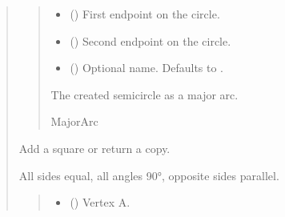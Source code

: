 \documentclass[letterpaper,10pt,english]{sphinxmanual}
\begin{document}
\begin{quote}
\begin{fulllineitems}
\begin{fulllineitems}
\begin{quote}
\begin{description}
\begin{itemize}
\item {} 
\sphinxAtStartPar
{} () \textendash{} First endpoint on the circle.

\item {} 
\sphinxAtStartPar
{} () \textendash{} Second endpoint on the circle.

\item {} 
\sphinxAtStartPar
{} (\sphinxstyleliteralemphasis{\sphinxupquote{ | }}) \textendash{} Optional name. Defaults to .

\end{itemize}

\sphinxAtStartPar
The created semicircle as a major arc.

\sphinxAtStartPar
MajorArc

\end{description}\end{quote}

\end{fulllineitems}


\begin{fulllineitems}
\label{\detokenize{pygeox:pygeox.add_objects.AddNamespace.square}}
\pysigstartsignatures
\pysiglinewithargsret
{}
{\sphinxparamcomma {}\sphinxparamcomma {}\sphinxparamcomma {}\sphinxparamcomma {}\sphinxparamcomma {}}
{}
\pysigstopsignatures
\sphinxAtStartPar
Add a square or return a copy.

\sphinxAtStartPar
All sides equal, all angles 90°, opposite sides parallel.
\begin{quote}\begin{description}
\begin{itemize}
\item {} 
\sphinxAtStartPar
{} (\sphinxstyleliteralemphasis{\sphinxupquote{ | }}) \textendash{} Vertex A.


\end{itemize}
\end{description}
\end{quote}
\end{fulllineitems}
\end{fulllineitems}
\end{quote}
\end{document}
